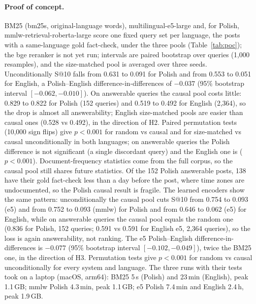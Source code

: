 \documentclass[11pt]{article}
\begin{document}
\paragraph{Proof of concept.}
BM25 (bm25s, original-language words), multilingual-e5-large and, for Polish, mmlw-retrieval-roberta-large score one fixed query set per language, the posts with a same-language gold fact-check, under the three pools (Table~\ref{tab:poc}); the bge reranker is not yet run; intervals are paired bootstrap over queries (1,000 resamples), and the size-matched pool is averaged over three seeds.
Unconditionally S@10 falls from 0.631 to 0.091 for Polish and from 0.553 to 0.051 for English, a Polish--English difference-in-differences of $-0.037$ (95\% bootstrap interval $[-0.062,-0.010]$).
On answerable queries the causal pool costs little: 0.829 to 0.822 for Polish (152 queries) and 0.519 to 0.492 for English (2,364), so the drop is almost all answerability; English size-matched pools are easier than causal ones (0.528 vs 0.492), in the direction of H2.
Paired permutation tests (10,000 sign flips) give $p<0.001$ for random vs causal and for size-matched vs causal unconditionally in both languages; on answerable queries the Polish difference is not significant (a single discordant query) and the English one is ($p<0.001$).
Document-frequency statistics come from the full corpus, so the causal pool still shares future statistics.
Of the 152 Polish answerable posts, 138 have their gold fact-check less than a day before the post, where time zones are undocumented, so the Polish causal result is fragile.
The learned encoders show the same pattern: unconditionally the causal pool cuts S@10 from 0.754 to 0.093 (e5) and from 0.752 to 0.093 (mmlw) for Polish and from 0.646 to 0.062 (e5) for English, while on answerable queries the causal pool equals the random one (0.836 for Polish, 152 queries; 0.591 vs 0.591 for English e5, 2,364 queries), so the loss is again answerability, not ranking.
The e5 Polish--English difference-in-differences is $-0.077$ (95\% bootstrap interval $[-0.102,-0.049]$), twice the BM25 one, in the direction of H3.
Permutation tests give $p<0.001$ for random vs causal unconditionally for every system and language.
The three runs with their tests took on a laptop (macOS, arm64): BM25 5\,s (Polish) and 23\,min (English), peak 1.1\,GB; mmlw Polish 4.3\,min, peak 1.1\,GB; e5 Polish 7.4\,min and English 2.4\,h, peak 1.9\,GB.
\end{document}
